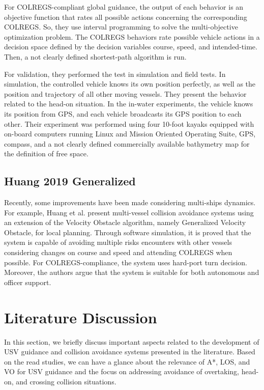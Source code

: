     For \ac{COLREGS}-compliant global guidance, the output of each behavior is an objective function that rates all possible actions concerning the corresponding \ac{COLREGS}. So, they use interval programming to solve the multi-objective optimization problem. The \ac{COLREGS} behaviors rate possible vehicle actions in a decision space defined by the decision variables course, speed, and intended-time. Then, a not clearly defined shortest-path algorithm is run.
    
    For validation, they performed the test in simulation and field tests. In simulation, the controlled vehicle knows its own position perfectly, as well as the position and trajectory of all other moving vessels. They present the behavior related to the head-on situation. In the in-water experiments, the vehicle knows its position from GPS, and each vehicle broadcasts its GPS position to each other. Their experiment was performed using four 10-foot kayaks equipped with on-board computers running Linux and Mission Oriented Operating Suite\cite{MOOS}, GPS, compass, and a not clearly defined commercially available bathymetry map for the definition of free space.
    
    \subsection{Huang 2019 Generalized}
    Recently, some improvements have been made considering multi-ships dynamics. For example, Huang et al. \cite{Huang2019Generalized} present multi-vessel collision avoidance systems using an extension of the Velocity Obstacle algorithm, namely Generalized Velocity Obstacle, for local planning. Through software simulation, it is proved that the system is capable of avoiding multiple risks encounters with other vessels considering changes on course and speed and attending \ac{COLREGS} when possible. For \ac{COLREGS}-compliance, the system uses hard-port turn decision. Moreover, the authors argue that the system is suitable for both autonomous and officer support.
    
    \section{Literature Discussion}
    
    In this section, we briefly discuss important aspects related to the development of \ac{USV} guidance and collision avoidance systems presented in the literature. Based on the read studies, we can have a glance about the relevance of A*, \ac{LOS}, and \ac{VO} for \ac{USV} guidance and the focus on addressing avoidance of overtaking, head-on, and crossing collision situations.
    
